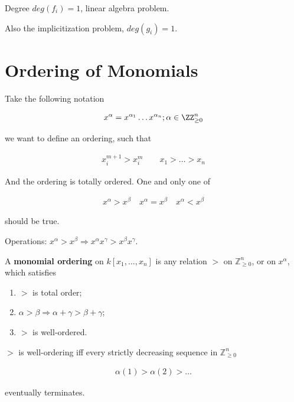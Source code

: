 \documentclass[Total.tex]{subfiles}
\begin{document}
			\begin{example}
				Degree $deg(f_i)=1$, linear algebra problem.
				
				Also the implicitization problem, $deg(g_i)=1$.
			\end{example}
			
			
			\section{Ordering of Monomials}
			
				Take the following notation 
				
				\begin{gather*}
					x^\alpha=x^{\alpha_1}\dots x^{\alpha_n};\alpha\in \ZZ^n_{\geq 0}
				\end{gather*}
				
				we want to define an ordering, such that
				
				\begin{gather*}
					x_i^{m+1}>x_i^m\qquad x_1>\dots>x_n
				\end{gather*}
				
				And the ordering is totally ordered. One and only one of
				
				\begin{gather*}
					x^\alpha>x^\beta\quad x^\alpha=x^\beta\quad x^\alpha<x^\beta
				\end{gather*}
				
				should be true. 
				
				Operations: $x^\alpha>x^\beta\Rightarrow x^\alpha x^\gamma>x^\beta x^\gamma$.
			
				\begin{Def}
					A \textbf{monomial ordering} on $k[x_1,\dots,x_n]$ is any relation $>$ on $\mathbb{Z}^n_{\geq 0}$, or on $x^\alpha$, which satisfies
					
					\begin{enumerate}
						\item $>$ is total order;
						
						\item $\alpha>\beta\Rightarrow \alpha+\gamma>\beta+\gamma$;
						
						\item $>$ is well-ordered.
					\end{enumerate}
				\end{Def}
				
				\begin{lemma}
					$>$ is well-ordering iff every strictly decreasing sequence in $\mathbb{Z}^n_{\geq 0}$ 
					
					\begin{gather*}
						\alpha(1)>\alpha(2)>\dots
					\end{gather*}
					
					eventually terminates.
				\end{lemma}
				
\end{document}
